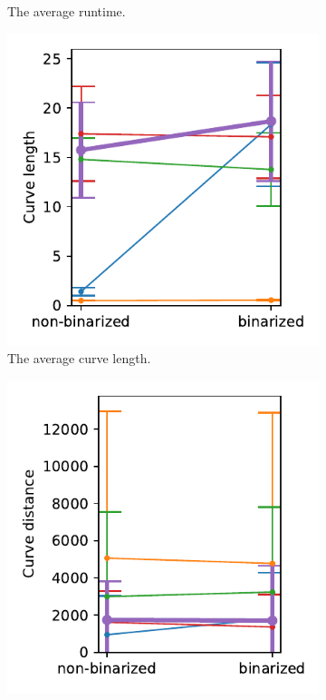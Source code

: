 \begin{figure}[h]
\begin{subfigure}{.3\textwidth}
    \caption{The average runtime.}
\end{subfigure}
    \begin{subfigure}{.3\textwidth}
    \centering
    \includegraphics[width=\textwidth]{graphics/eval/curve length_True_1024-1.024_tonari.pdf}
    \caption{The average curve length.}
\end{subfigure}
    \begin{subfigure}{.3\textwidth}
    \centering
    \includegraphics[width=\textwidth]{graphics/eval/curve distance_True_1024-1.024_tonari.pdf}

\end{subfigure}
\end{figure}

